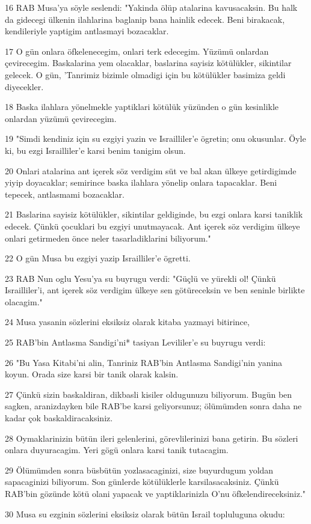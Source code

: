 \par 16 RAB Musa'ya söyle seslendi: "Yakinda ölüp atalarina kavusacaksin. Bu halk da gidecegi ülkenin ilahlarina baglanip bana hainlik edecek. Beni birakacak, kendileriyle yaptigim antlasmayi bozacaklar.
\par 17 O gün onlara öfkelenecegim, onlari terk edecegim. Yüzümü onlardan çevirecegim. Baskalarina yem olacaklar, baslarina sayisiz kötülükler, sikintilar gelecek. O gün, 'Tanrimiz bizimle olmadigi için bu kötülükler basimiza geldi diyecekler.
\par 18 Baska ilahlara yönelmekle yaptiklari kötülük yüzünden o gün kesinlikle onlardan yüzümü çevirecegim.
\par 19 "Simdi kendiniz için su ezgiyi yazin ve Israilliler'e ögretin; onu okusunlar. Öyle ki, bu ezgi Israilliler'e karsi benim tanigim olsun.
\par 20 Onlari atalarina ant içerek söz verdigim süt ve bal akan ülkeye getirdigimde yiyip doyacaklar; semirince baska ilahlara yönelip onlara tapacaklar. Beni tepecek, antlasmami bozacaklar.
\par 21 Baslarina sayisiz kötülükler, sikintilar geldiginde, bu ezgi onlara karsi taniklik edecek. Çünkü çocuklari bu ezgiyi unutmayacak. Ant içerek söz verdigim ülkeye onlari getirmeden önce neler tasarladiklarini biliyorum."
\par 22 O gün Musa bu ezgiyi yazip Israilliler'e ögretti.
\par 23 RAB Nun oglu Yesu'ya su buyrugu verdi: "Güçlü ve yürekli ol! Çünkü Israilliler'i, ant içerek söz verdigim ülkeye sen götüreceksin ve ben seninle birlikte olacagim."
\par 24 Musa yasanin sözlerini eksiksiz olarak kitaba yazmayi bitirince,
\par 25 RAB'bin Antlasma Sandigi'ni* tasiyan Levililer'e su buyrugu verdi:
\par 26 "Bu Yasa Kitabi'ni alin, Tanriniz RAB'bin Antlasma Sandigi'nin yanina koyun. Orada size karsi bir tanik olarak kalsin.
\par 27 Çünkü sizin baskaldiran, dikbasli kisiler oldugunuzu biliyorum. Bugün ben sagken, aranizdayken bile RAB'be karsi geliyorsunuz; ölümümden sonra daha ne kadar çok baskaldiracaksiniz.
\par 28 Oymaklarinizin bütün ileri gelenlerini, görevlilerinizi bana getirin. Bu sözleri onlara duyuracagim. Yeri gögü onlara karsi tanik tutacagim.
\par 29 Ölümümden sonra büsbütün yozlasacaginizi, size buyurdugum yoldan sapacaginizi biliyorum. Son günlerde kötülüklerle karsilasacaksiniz. Çünkü RAB'bin gözünde kötü olani yapacak ve yaptiklarinizla O'nu öfkelendireceksiniz."
\par 30 Musa su ezginin sözlerini eksiksiz olarak bütün Israil topluluguna okudu:

